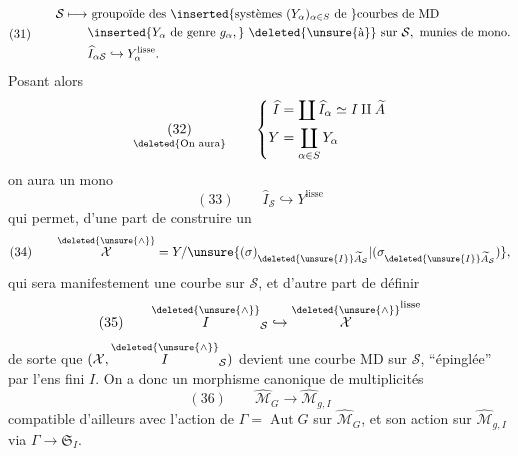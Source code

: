\[
(31)\qquad\begin{aligned}
\mathcal S\longmapsto&\ \text{groupoïde des }\inserted{\text{systèmes }(Y_\alpha)_{\alpha\in S}\text{ de }}\text{courbes de MD}\\
&\inserted{Y_\alpha\text{ de genre }g_\alpha,}\ \text{\deleted{\unsure{à}} sur }\mathcal S,\text{ munies de mono.}\\
&\widehat I_{\alpha\mathcal S}\hookrightarrow Y_\alpha^{\text{lisse}}.
\end{aligned}
\]
Posant alors
\[
\underset{\text{\deleted{On aura}}}{(32)}\qquad\left\{\begin{aligned}
\widehat I&=\coprod\widehat I_\alpha\simeq I\amalg\widetilde A\\
Y&=\coprod_{\alpha\in S}Y_\alpha
\end{aligned}\right.
\]
on aura un mono
\[
(33)\qquad\widehat I_{\mathcal S}\hookrightarrow Y^{\text{lisse}}
\]
qui permet, d'une part de construire un
\[
(34)\qquad\overset{\deleted{\unsure{\wedge}}}{\mathcal X}=Y/\unsure{(\sigma)_{\deleted{\unsure{I}}\widetilde A_{\mathcal S}}|(\sigma_{\deleted{\unsure{I}}\widetilde A_{\mathcal S}})},
\]
qui sera manifestement une courbe  sur $\mathcal S$, et d'autre part de définir
\[
(35)\qquad\overset{\deleted{\unsure{\wedge}}}{I}_{\mathcal S}\hookrightarrow\overset{\deleted{\unsure{\wedge}}}{\mathcal X}^{\text{lisse}}
\]
de sorte que $(\mathcal X,\overset{\deleted{\unsure{\wedge}}}{I}_{\mathcal S})$ devient une courbe  MD sur $\mathcal S$, ``épinglée'' par l'ens fini $I$. On a donc un morphisme canonique de multiplicités
\[
(36)\qquad\widehat{\mathcal M}_G\longrightarrow\widehat{\mathcal M}_{g,I}
\]
compatible d'ailleurs avec l'action de $\Gamma=\operatorname{Aut}G$ sur $\widehat{\mathcal M}_G$, et son action sur $\widehat{\mathcal M}_{g,I}$ via $\Gamma\to\mathfrak S_I$.
